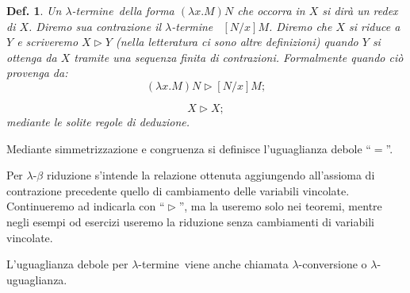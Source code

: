 \documentclass{book}
\newtheorem{definizione}{Def.}[chapter]
\newcommand*{\lbt}{$\lambda$-ter\-mi\-ne}
\begin{document}
\begin{definizione}
Un \lbt ~della forma $(\lambda x.M)N$ che occorra in $X$ si dir\`a un 
\emph{redex} di $X$. Diremo sua contrazione il \lbt ~ $[N/x]M$.
Diremo che $X$ si riduce a $Y$ e scriveremo $X \vartriangleright Y$ (nella 
letteratura ci sono altre definizioni) quando $Y$ si ottenga da $X$ tramite
una sequenza finita di contrazioni. Formalmente quando ci\`o provenga da:
\[
(\lambda x.M)N \vartriangleright [N/x]M;
\]

\[
X \vartriangleright X;
\]
mediante le solite regole di deduzione.
\end{definizione}
Mediante simmetrizzazione e congruenza si definisce l'uguaglianza debole 
``$=$''.

Per $\lambda$-$\beta$ riduzione s'intende la relazione ottenuta aggiungendo 
all'assioma di contrazione precedente quello di cambiamento delle variabili
vincolate. Continueremo ad indicarla con ``$\vartriangleright$'', ma la useremo
solo nei teoremi, mentre negli esempi od esercizi useremo la riduzione senza
cambiamenti di variabili vincolate.

L'uguaglianza debole per \lbt ~viene anche chiamata $\lambda$-conversione o
$\lambda$-uguaglianza.
\end{document}
